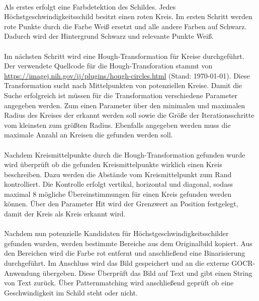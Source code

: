\paragraph*{}
Als erstes erfolgt eine Farbdetektion des Schildes.
Jedes Höchstgeschwindigkeitsschild besitzt einen roten Kreis.
Im ersten Schritt werden rote Punkte durch die Farbe Weiß ersetzt und alle andere Farben auf Schwarz.
Dadurch wird der Hintergrund Schwarz und relevante Punkte Weiß.

\paragraph*{}
Im nächsten Schritt wird eine Hough-Transformation für Kreise durchgeführt.
Der verwendete Quellcode für die Hough-Transforation stammt von \url{https://imagej.nih.gov/ij/plugins/hough-circles.html} (Stand: \today).
Diese Transformation sucht nach Mittelpunkten von potenziellen Kreise.
Damit die Suche erfolgreich ist müssen für die Transformation verschiedene Parameter angegeben werden.
Zum einen Parameter über den minimalen und maximalen Radius des Kreises der erkannt werden soll sowie die Größe der Iterationsschritte vom kleinsten zum größten Radius.
Ebenfalls angegeben werden muss die maximale Anzahl an Kreisen die gefunden werden soll. 

\paragraph*{}
Nachdem Kreismittelpunkte durch die Hough-Transformation gefunden wurde wird überprüft ob die gefunden Kreismittelpunkte wirklich einen Kreis beschreiben.
Dazu werden die Abstände vom Kreismittelpunkt zum Rand kontrolliert.
Die Kontrolle erfolgt vertikal, horizontal und diagonal, sodass maximal 8 mögliche Übereinstimmungen für einen Kreis gefunden werden können.
Über den Parameter Hit wird der Grenzwert an Position festgelegt, damit der Kreis als Kreis erkannt wird.

\paragraph*{}
Nachdem nun potenzielle Kandidaten für Höchstgeschwindigkeitsschilder gefunden wurden, werden bestimmte Bereiche aus dem Originalbild kopiert.
Aus den Bereichen wird die Farbe rot entfernt und anschließend eine Binarisierung durchgeführt.
Im Anschluss wird das Bild gespeichert und an die externe GOCR-Anwendung übergeben.
Diese Überprüft das Bild auf Text und gibt einen String von Text zurück.
Über Patternmatching wird anschließend geprüft ob eine Geschwindigkeit im Schild steht oder nicht.

